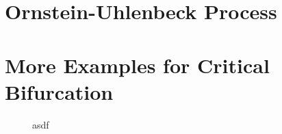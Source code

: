 \appendix
\section{Ornstein-Uhlenbeck Process}

\section{More Examples for Critical Bifurcation}
\begin{figure}[!ht]
	\caption{asdf}
	\label{fig:bifTranscritical}
\end{figure}